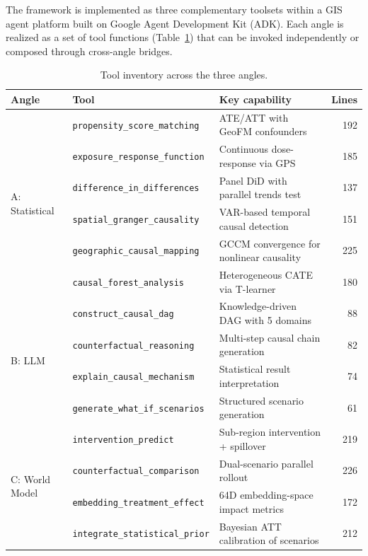 \documentclass{article}
\begin{document}
The framework is implemented as three complementary toolsets within a GIS agent platform built on Google Agent Development Kit (ADK). Each angle is realized as a set of tool functions (Table~\ref{tab:tools}) that can be invoked independently or composed through cross-angle bridges.

\begin{table}[htbp]
\centering
\caption{Tool inventory across the three angles.}
\label{tab:tools}
\begin{tabular}{lllr}
\toprule
Angle & Tool & Key capability & Lines \\
\midrule
\multirow{6}{*}{A: Statistical} & \texttt{propensity\_score\_matching} & ATE/ATT with GeoFM confounders & 192 \\
 & \texttt{exposure\_response\_function} & Continuous dose-response via GPS & 185 \\
 & \texttt{difference\_in\_differences} & Panel DiD with parallel trends test & 137 \\
 & \texttt{spatial\_granger\_causality} & VAR-based temporal causal detection & 151 \\
 & \texttt{geographic\_causal\_mapping} & GCCM convergence for nonlinear causality & 225 \\
 & \texttt{causal\_forest\_analysis} & Heterogeneous CATE via T-learner & 180 \\
\midrule
\multirow{4}{*}{B: LLM} & \texttt{construct\_causal\_dag} & Knowledge-driven DAG with 5 domains & 88 \\
 & \texttt{counterfactual\_reasoning} & Multi-step causal chain generation & 82 \\
 & \texttt{explain\_causal\_mechanism} & Statistical result interpretation & 74 \\
 & \texttt{generate\_what\_if\_scenarios} & Structured scenario generation & 61 \\
\midrule
\multirow{4}{*}{C: World Model} & \texttt{intervention\_predict} & Sub-region intervention + spillover & 219 \\
 & \texttt{counterfactual\_comparison} & Dual-scenario parallel rollout & 226 \\
 & \texttt{embedding\_treatment\_effect} & 64D embedding-space impact metrics & 172 \\
 & \texttt{integrate\_statistical\_prior} & Bayesian ATT calibration of scenarios & 212 \\
\bottomrule
\end{tabular}
\end{table}
\end{document}
